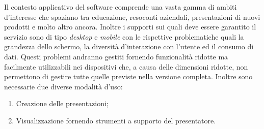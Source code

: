 Il contesto applicativo del software comprende una vasta gamma di ambiti d'interesse che spaziano tra educazione, resoconti aziendali, presentazioni di nuovi prodotti e molto altro ancora.
Inoltre i supporti sui quali deve essere garantito il servizio sono di tipo \textit{desktop} e \textit{mobile} con le rispettive problematiche quali la grandezza dello schermo, la diversità d'interazione con l'utente ed il consumo di dati. Questi problemi andranno gestiti fornendo funzionalità ridotte ma facilmente utilizzabili nei dispositivi che, a causa delle dimensioni ridotte, non permettono di gestire tutte quelle previste nella versione completa.
Inoltre sono necessarie due diverse modalità d'uso:
\begin{enumerate}
  \item Creazione delle presentazioni;
  \item Visualizzazione fornendo strumenti a supporto del presentatore.
\end{enumerate}
